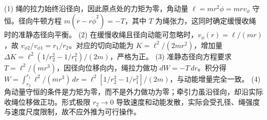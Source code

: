 (1) 绳的拉力始终沿径向，因此原点处的力矩为零，角动量 \(\ell=mr^2\dot\phi=mr v_\phi\) 守恒。径向牛顿方程 \(m(\ddot r-r\dot\phi^2)=-T\)，其中 \(T\) 为绳张力，这同时确定缓慢收绳时的准静态径向平衡。
(2) 在缓慢收绳且径向动能可忽略时，\(v_\phi(r)=\ell/(mr)\)，故 \(v_{\phi2}/v_{\phi1}=r_1/r_2\)。对应的切向动能为 \(K=\ell^2/(2mr^2)\)，增加量 \(\Delta K=\ell^2(1/r_2^2-1/r_1^2)/(2m)\)，严格为正。
(3) 准静态径向方程要求 \(T=\ell^2/(mr^3)\)，因径向位移向内，绳拉力做功 \(dW=-T\,dr\)。积分得 \(W=\int_{r_2}^{r_1}\ell^2/(mr^3)\,dr=\ell^2[1/r_2^2-1/r_1^2]/(2m)\)，与动能增量完全一致。
(4) 角动量守恒的条件是力矩为零，而不是外力做功为零；牵引力虽沿径向，却沿实际收绳位移做正功。形式极限 \(r_2\to0\) 导致速度和动能发散，实际会受孔径、绳强度与速度尺度限制，故不应外推为可行操作。
